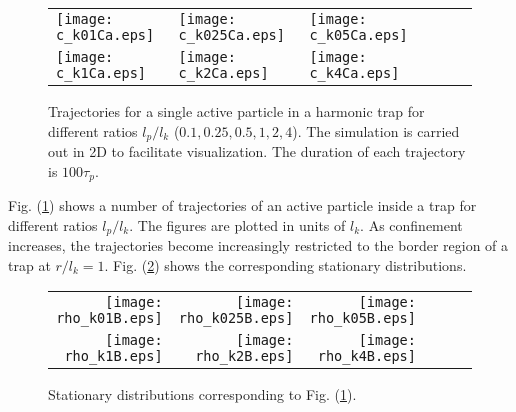 \documentclass[pre,twocolumn,graphicx]{revtex4-1}
\begin{document}
\graphicspath{{figures/}}
\begin{figure}[h] 
 \begin{center}
 \begin{tabular}{llllll}
  \texttt{[image: c\_k01Ca.eps]} &
  \texttt{[image: c\_k025Ca.eps]} &
  \texttt{[image: c\_k05Ca.eps]} \\
    \texttt{[image: c\_k1Ca.eps]} &
  \texttt{[image: c\_k2Ca.eps]} &
  \texttt{[image: c\_k4Ca.eps]} \\
 \end{tabular}
 \end{center}
\caption{Trajectories for a single active particle in a harmonic trap for different ratios $l_p/l_k$
($0.1,0.25,0.5,1,2,4$).  The simulation is carried out in 2D to facilitate visualization.  
The duration of each trajectory is $100\tau_p$.  }
\label{fig:c}
\end{figure}
Fig. (\ref{fig:c}) shows a number of trajectories of an active particle inside a trap for different ratios $l_p/l_k$.
The figures are plotted in units of $l_k$.  As confinement increases, the trajectories become increasingly 
restricted to the border region of a trap at $r/l_k=1$.  Fig. (\ref{fig:rho_c}) shows the corresponding stationary 
distributions.  
\graphicspath{{figures/}}
\begin{figure}[h] 
 \begin{center}
 \begin{tabular}{rrrrrr}
  \texttt{[image: rho\_k01B.eps]} &
  \texttt{[image: rho\_k025B.eps]} &
  \texttt{[image: rho\_k05B.eps]} \\
  \texttt{[image: rho\_k1B.eps]} &
  \texttt{[image: rho\_k2B.eps]} &
  \texttt{[image: rho\_k4B.eps]} \\
 \end{tabular}
 \end{center}
\caption{Stationary distributions corresponding to Fig. (\ref{fig:c}). }
\label{fig:rho_c}
\end{figure}
\end{document}
